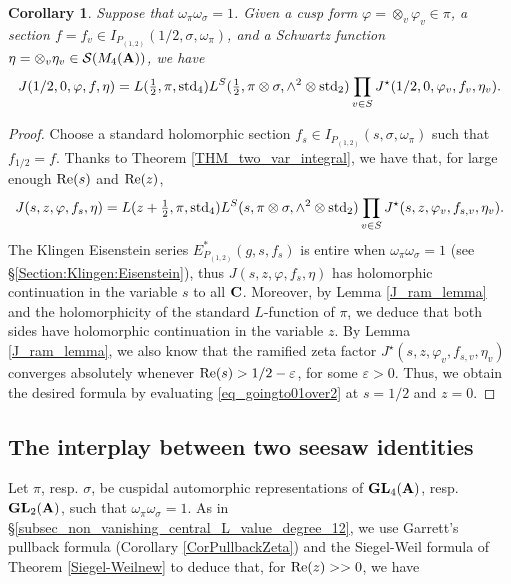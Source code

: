 \documentclass[11pt, reqno]{amsart}
\theoremstyle{plain}
\newtheorem{corollary}[theorem]{Corollary}
\theoremstyle{definition}
\theoremstyle{remark}
\theoremstyle{plain}
\def\C{{\bf C}}
\def\A{{\bf A}}
\def\epsilon{\varepsilon}
\def\GL{\mathbf{GL}}
\begin{document}
\begin{corollary}\label{Corollary:Multi:Variable:Integral}
Suppose that  $\omega_\pi  \omega_\sigma =1$. Given a cusp form $\varphi = \otimes_v \varphi_v\in \pi$, a section $f =  f_{v} \in I_{P_{(1,2)}}(1/2,\sigma,\omega_{\pi})$, and a Schwartz function $\eta = \otimes_v \eta_v \in \mathcal{S}(M_4(\A))$, we have 
    \[ J(1/2, 0,\varphi, f, \eta) =L( \tfrac{1}{2},\pi,{\rm std}_4)L^S(\tfrac{1}{2},\pi \otimes \sigma,\wedge^2 \otimes \mathrm{std}_2) \prod_{v \in S} J^\star(1/2,0,\varphi_v,f_{v},\eta_v).\]
\end{corollary}
\begin{proof}
    Choose a standard holomorphic section $f_s \in I_{P_{(1,2)}}(s,\sigma, \omega_\pi)$ such that $f_{1/2}=f$. Thanks to Theorem \ref{THM_two_var_integral}, we have that, for large enough ${\rm Re}(s)$ and ${\rm Re}(z)$, 
    \begin{align}\label{eq_goingto01over2}
        J(s,z,\varphi,f_s, \eta) = L(z+ \tfrac{1}{2},\pi,{\rm std}_4) L^S(s,\pi \otimes \sigma,\wedge^2 \otimes \mathrm{std}_2) \prod_{v \in S} J^\star(s,z,\varphi_v,f_{s,v},\eta_v).
    \end{align} 
     The Klingen Eisenstein series $E^*_{P_{(1,2)}}(g,s, f_s)$ is entire when $\omega_{\pi}\omega_{\sigma}= 1$ (see \S\ref{Section:Klingen:Eisenstein}), thus $J(s,z,\varphi,f_s, \eta)$ has holomorphic continuation in the variable $s$ to all $\C$. Moreover, by Lemma \ref{J_ram_lemma} and the holomorphicity of the standard $L$-function of $\pi$, we deduce that both sides have holomorphic continuation in the variable $z$. By Lemma \ref{J_ram_lemma}, we also know that the ramified zeta factor $J^\star(s,z,\varphi_v,f_{s,v},\eta_v)$ converges absolutely whenever ${\rm Re}(s) > 1/2 - \epsilon$, for some $\epsilon >0$. Thus, we obtain the desired formula by evaluating \eqref{eq_goingto01over2} at $s = 1/2$ and $z = 0$.
\end{proof}



\subsection{The interplay between two seesaw identities}\label{Two:SeeSaw:Section}
 
 Let $\pi$, resp. $\sigma$, be cuspidal automorphic representations of 
$\GL_4(\A)$, resp. $\GL_2(\A)$, such that 
$\omega_\pi  \omega_\sigma =1$.
As in \S \ref{subsec_non_vanishing_central_L_value_degree_12}, we use Garrett's pullback formula (Corollary \ref{CorPullbackZeta}) and the Siegel-Weil formula of Theorem \ref{Siegel-Weilnew} to deduce that, for ${\rm Re}(z)>>0$, we have 
\end{document}
